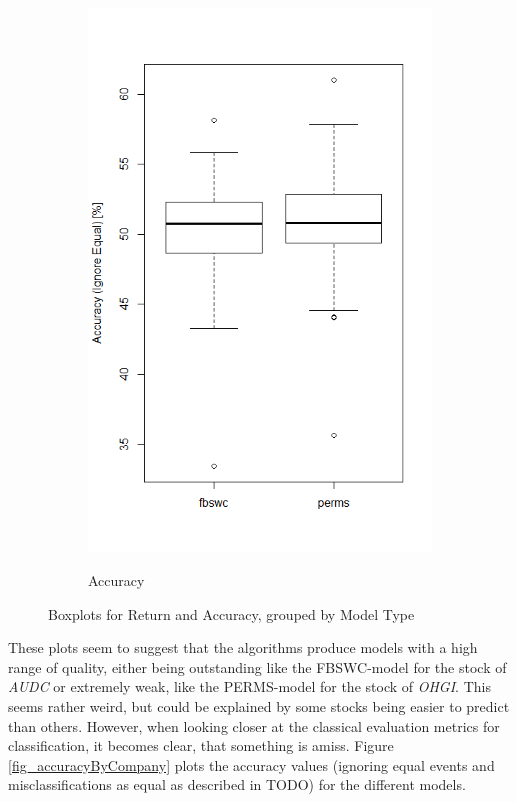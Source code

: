 \begin{figure}[h]
\begin{subfigure}{.5\textwidth}
  \includegraphics[width=\linewidth]{boxplotAccuracy}
  \label{fig_accuracyBoxplot}
  \caption{Accuracy}
\end{subfigure}
\caption{Boxplots for Return and Accuracy, grouped by Model Type}
\label{fig_returnBoxplots}
\end{figure}

These plots seem to suggest that the algorithms produce models with a high range of quality, either being outstanding like the FBSWC-model for the stock of \textit{AUDC} or extremely weak, like the PERMS-model for the stock of \textit{OHGI}. This seems rather weird, but could be explained by some stocks being easier to predict than others. However, when looking closer at the classical evaluation metrics for classification, it becomes clear, that something is amiss. Figure \ref{fig_accuracyByCompany} plots the accuracy values (ignoring equal events and misclassifications as equal as described in TODO) for the different models. 

